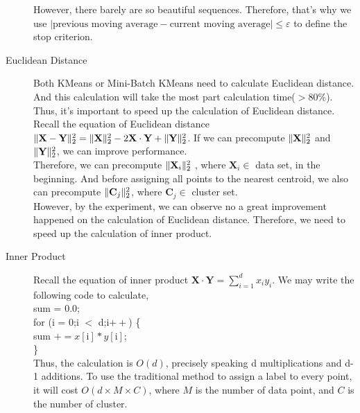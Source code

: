 \documentclass[final,leqno,onefignum,onetabnum]{siamltexmm}
\DeclarePairedDelimiter\norm{\lVert}{\rVert}%
\begin{document}
\begin{description}
However, there barely are so beautiful sequences. Therefore, that's why we use  $ | \text{previous moving average} - \text{current moving average} | \leq \varepsilon $ to define the stop criterion.

\item[Euclidean Distance]

Both KMeans or Mini-Batch KMeans need to calculate Euclidean distance. And this calculation will take the most part calculation time($> 80\%$). Thus, it's  important to speed up the calculation of Euclidean distance. \\

Recall the equation of Euclidean distance $ \norm{\textbf{X} - \textbf{Y}}_2^2 = \norm{\textbf{X}}_2^2 - 2\textbf{X} \cdot \textbf{Y} + \norm{\textbf{Y}}_2^2 $.
If we can precompute $\norm{\textbf{X}}_2^2$ and $\norm{\textbf{Y}}_2^2$, we can improve performance. \\ 

Therefore, we can precompute $\norm{\textbf{X}_i}_2^2$ , where $\textbf{X}_i \in$ data set,  in the beginning. 
And before assigning all points to the nearest centroid, we also can precompute $\norm{\textbf{C}_j}_2^2$, where $\textbf{C}_j \in$ cluster set. \\

However, by the experiment, we can observe no a great improvement happened on the calculation of Euclidean distance. Therefore, we need to speed up the calculation of inner product.

\item[Inner Product]

Recall the equation of inner product $\textbf{X} \cdot \textbf{Y} = \sum_{i=1}^{d} x_i y_i$. We may write the following code to calculate, \\
sum = 0.0; \\
for (i = 0;i $<$ d;i$++$) \{ \\
sum $+= x[\text{i}] * y[\text{i}]$; \\
\} \\

Thus, the calculation is $O(d)$, precisely speaking d multiplications and d-1 additions. To use the traditional method to assign a label to every point, it will cost $O(d \times M \times C)$, where $M$ is the number of data point, and $C$ is the number of cluster.


\end{description}
\end{document}
